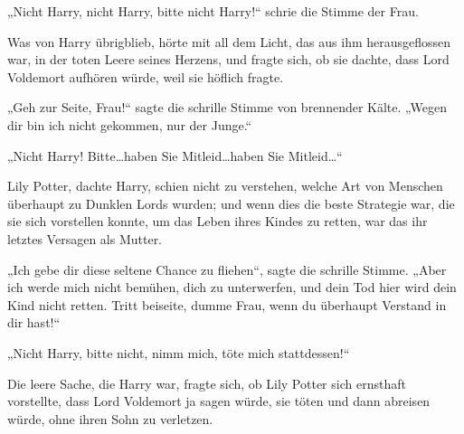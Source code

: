 \begin{em}
„Nicht Harry, nicht Harry, bitte nicht Harry!“ schrie die Stimme der Frau.

Was von Harry übrigblieb, hörte mit all dem Licht, das aus ihm herausgeflossen war, in der toten Leere seines Herzens, und fragte sich, ob sie dachte, dass Lord Voldemort aufhören würde, weil sie höflich fragte.

„Geh zur Seite, Frau!“ sagte die schrille Stimme von brennender Kälte. „Wegen dir bin ich nicht gekommen, nur der Junge.“

„Nicht Harry! Bitte…haben Sie Mitleid…haben Sie Mitleid…“

Lily Potter, dachte Harry, schien nicht zu verstehen, welche Art von Menschen überhaupt zu Dunklen Lords wurden; und wenn dies die beste Strategie war, die sie sich vorstellen konnte, um das Leben ihres Kindes zu retten, war das ihr letztes Versagen als Mutter.

„Ich gebe dir diese seltene Chance zu fliehen“, sagte die schrille Stimme. „Aber ich werde mich nicht bemühen, dich zu unterwerfen, und dein Tod hier wird dein Kind nicht retten. Tritt beiseite, dumme Frau, wenn du überhaupt Verstand in dir hast!“

„Nicht Harry, bitte nicht, nimm mich, töte mich stattdessen!“

Die leere Sache, die Harry war, fragte sich, ob Lily Potter sich ernsthaft vorstellte, dass Lord Voldemort ja sagen würde, sie töten und dann abreisen würde, ohne ihren Sohn zu verletzen.


\end{em}
